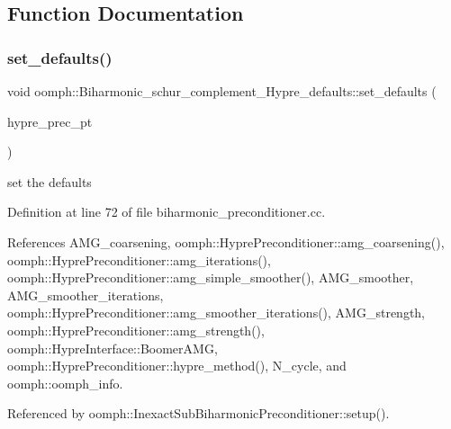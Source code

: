 \subsection{Function Documentation}
\mbox{\label{namespaceoomph_1_1Biharmonic__schur__complement__Hypre__defaults_acff454a359087ff5bcdc63521c9e6228}} 
\subsubsection{\texorpdfstring{set\+\_\+defaults()}{set\_defaults()}}
{\footnotesize\ttfamily void oomph\+::\+Biharmonic\+\_\+schur\+\_\+complement\+\_\+\+Hypre\+\_\+defaults\+::set\+\_\+defaults (\begin{DoxyParamCaption}\item[{\hyperlink{classoomph_1_1HyprePreconditioner}{Hypre\+Preconditioner} $\ast$}]{hypre\+\_\+prec\+\_\+pt }\end{DoxyParamCaption})}



set the defaults 



Definition at line 72 of file biharmonic\+\_\+preconditioner.\+cc.



References A\+M\+G\+\_\+coarsening, oomph\+::\+Hypre\+Preconditioner\+::amg\+\_\+coarsening(), oomph\+::\+Hypre\+Preconditioner\+::amg\+\_\+iterations(), oomph\+::\+Hypre\+Preconditioner\+::amg\+\_\+simple\+\_\+smoother(), A\+M\+G\+\_\+smoother, A\+M\+G\+\_\+smoother\+\_\+iterations, oomph\+::\+Hypre\+Preconditioner\+::amg\+\_\+smoother\+\_\+iterations(), A\+M\+G\+\_\+strength, oomph\+::\+Hypre\+Preconditioner\+::amg\+\_\+strength(), oomph\+::\+Hypre\+Interface\+::\+Boomer\+A\+MG, oomph\+::\+Hypre\+Preconditioner\+::hypre\+\_\+method(), N\+\_\+cycle, and oomph\+::oomph\+\_\+info.



Referenced by oomph\+::\+Inexact\+Sub\+Biharmonic\+Preconditioner\+::setup().



